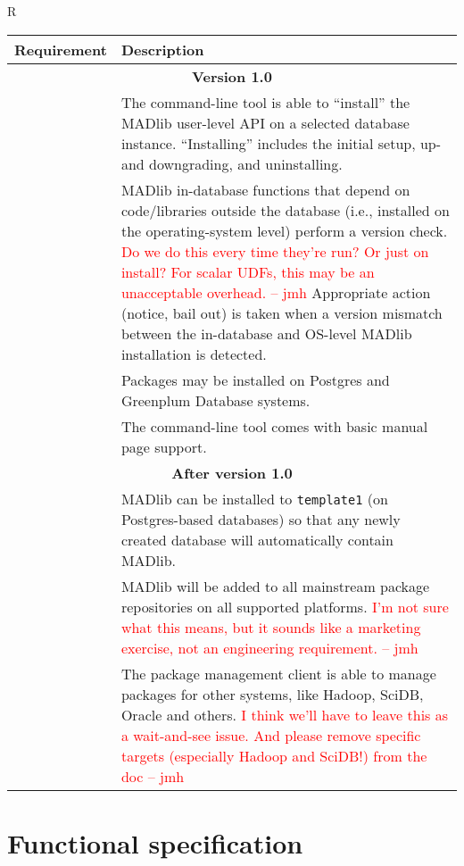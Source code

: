 \documentclass[11pt]{article}
\newcommand{\jmh}[1]{{\textcolor{red}{#1 -- jmh}}}
\begin{document}
{\begin{mlreq}{R}
\begin{tabular}{|l|p{133mm}|}
\hline
	\textbf{Requirement} & \textbf{Description} \\
\hline
	\multicolumn{2}{|c|}{\bf Version 1.0} \\
\hline
	\mlr & The command-line tool is able to ``install'' the MADlib user-level API on a selected database instance. ``Installing'' includes the initial setup, up\nobreakdash- and downgrading, and uninstalling. \\
\hline
	\mlr & MADlib in-database functions that depend on code/libraries outside the database (i.e., installed on the operating-system level) perform a version check. \jmh{Do we do this every time they're run?  Or just on install?  For scalar UDFs, this may be an unacceptable overhead.}  Appropriate action (notice, bail out) is taken when a version mismatch between the in-database and OS-level MADlib installation is detected. \\
\hline
	\mlr & Packages may be installed on Postgres and Greenplum Database systems. \\
\hline
	\mlr & The command-line tool comes with basic manual page support.\\
\hline
	\multicolumn{2}{|c|}{\bf After version 1.0} \\
\hline
	\mlr & MADlib can be installed to \texttt{template1} (on Postgres-based databases) so that any
newly created database will automatically contain MADlib. \\
\hline
	\mlr & MADlib will be added to all mainstream package repositories on all supported platforms. \jmh{I'm not sure what this means, but it sounds like a marketing exercise, not an engineering requirement.}\\
\hline
	\mlr & The package management client is able to manage packages for other
		   systems, like Hadoop, SciDB, Oracle and others. \jmh{I think we'll have to leave this as a wait-and-see issue.  And please remove specific targets (especially Hadoop and SciDB!) from the doc} \\
\hline

\end{tabular}
\end{mlreq}

\ifx\pdfoutput\undefined %
\else
{}
\fi

\section{Functional specification}

}
\end{document}
